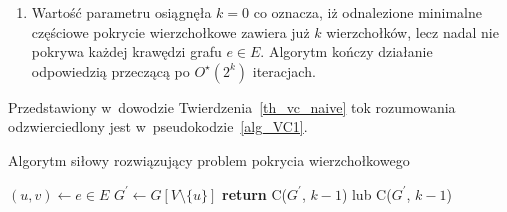 {\begin{bproof}
\begin{enumerate}
      \item Wartość parametru osiągnęła $k=0$ co oznacza, iż odnalezione minimalne częściowe pokrycie wierzchołkowe zawiera już $k$ wierzchołków, lecz nadal nie pokrywa każdej krawędzi grafu $e \in E$.
      Algorytm kończy działanie odpowiedzią przeczącą po $O^\star(2^k)$ iteracjach.
    \end{enumerate}
  \end{bproof}
  Przedstawiony w~dowodzie Twierdzenia~\ref{th_vc_naive} tok rozumowania odzwierciedlony jest w~pseudokodzie~\ref{alg_VC1}.
  \begin{algorithm}
    \caption{Algorytm siłowy rozwiązujący problem pokrycia wierzchołkowego}\label{alg_VC1}
    \begin{algorithmic}[1]



        \EndIf
        \EndIf
        \State $(u,v) \leftarrow e \in E$
        \State $G^\prime \gets G[V\setminus \{u\}]$
        \State \textbf{return} {C($G^\prime$, $k-1$) lub C($G^\prime$, $k-1$)}
      \EndFunction
    \end{algorithmic}
  \end{algorithm}
}
